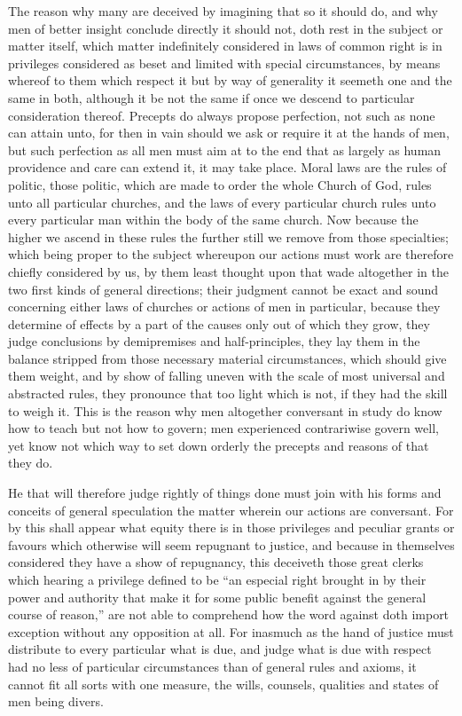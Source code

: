 The reason why many are deceived by imagining that so it should do, and why men of better insight conclude directly it should not, doth rest in the subject or matter itself, which matter indefinitely considered in laws of common right is in privileges considered as beset and limited with special circumstances, by means whereof to them which respect it but by way of generality it seemeth one and the same in both, although it be not the same if once we descend to particular consideration thereof. Precepts do always propose perfection, not such as none can attain unto, for then in vain should we ask or require it at the hands of men, but such perfection as all men must aim at to the end that as largely as human providence and  care can extend it, it may take place. Moral laws are the rules of politic, those politic, which are made to order the whole Church of God, rules unto all particular churches, and the laws of every particular church rules unto every particular man within the body of the same church. Now because the higher we ascend in these rules the further still we remove from those specialties; which being proper to the subject whereupon our actions must work are therefore chiefly considered by us, by them least thought upon that wade altogether in the two first kinds of general directions; their judgment cannot be exact and sound concerning either laws of churches or actions of men in particular, because they determine of effects by a part of the causes only out of which they grow, they judge conclusions by demipremises and half-principles, they lay them in the balance stripped from those necessary material circumstances, which should give them weight, and by show of falling uneven with the scale of most universal and abstracted rules, they pronounce that too light which is not, if they had the skill to weigh it. This is the reason why men altogether conversant in study do know how to teach but not how to govern; men experienced contrariwise govern well, yet know not which way to set down orderly the precepts and reasons of that they do.

He that will therefore judge rightly of things done must join with his forms and conceits of general speculation the matter wherein our actions are conversant. For by this shall appear what equity there is in those privileges and peculiar grants or favours which otherwise will seem repugnant to justice, and because in themselves considered they have a show of repugnancy, this deceiveth those great clerks which hearing a privilege defined to be “an especial right brought in by their power and authority that make it for some public benefit against the general course of reason,” are not able to comprehend how the word against doth import exception without any opposition at all. For inasmuch as the hand of justice must distribute to every particular what is due, and judge what is due with respect had no less of  particular circumstances than of general rules and axioms, it cannot fit all sorts with one measure, the wills, counsels, qualities and states of men being divers.

